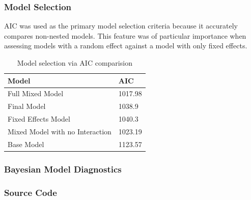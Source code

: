 \documentclass[12pt]{article}
\begin{document}
\hypertarget{model-selection}{%
\subsubsection{Model Selection}\label{model-selection}}

AIC was used as the primary model selection criteria because it accurately compares non-nested models. This feature was of particular importance when assessing models with a random effect against a model with only fixed effects.

\begin{table}[!h]
\centering
\begin{tabular}{ll}
  \toprule
Model & AIC \\ 
  \midrule
Full Mixed Model & 1017.98 \\ 
  Final Model & 1038.9 \\ 
  Fixed Effects Model & 1040.3 \\ 
  Mixed Model with no Interaction & 1023.19 \\ 
  Base Model & 1123.57 \\ 
   \bottomrule
\end{tabular}
\caption{Model selection via AIC comparision} 
\end{table}

\hypertarget{bayesian-model-diagnostics}{%
\subsubsection{Bayesian Model Diagnostics}\label{bayesian-model-diagnostics}}

\hypertarget{source-code}{%
\subsubsection{Source Code}\label{source-code}}
\end{document}
